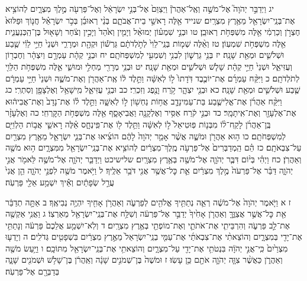 \documentclass[twoside, openany, parskip=half, 11pt]{book}
\begin{document}
יג וַיְדַבֵּ֣ר יְהֹוָה֮ אֶל־מֹשֶׁ֣ה וְאֶֽל־אַהֲרֹן֒ וַיְצַוֵּם֙ אֶל־בְּנֵ֣י יִשְׂרָאֵ֔ל וְאֶל־פַּרְעֹ֖ה מֶ֣לֶךְ מִצְרָ֑יִם לְהוֹצִ֥יא אֶת־בְּנֵֽי־יִשְׂרָאֵ֖ל מֵאֶ֥רֶץ מִצְרָֽיִם׃
שנייד אֵ֖לֶּה רָאשֵׁ֣י בֵית־אֲבֹתָ֑ם בְּנֵ֨י רְאוּבֵ֜ן בְּכֹ֣ר יִשְׂרָאֵ֗ל חֲנ֤וֹךְ וּפַלּוּא֙ חֶצְרֹ֣ן וְכַרְמִ֔י אֵ֖לֶּה מִשְׁפְּחֹ֥ת רְאוּבֵֽן׃ טו וּבְנֵ֣י שִׁמְע֗וֹן יְמוּאֵ֨ל וְיָמִ֤ין וְאֹ֙הַד֙ וְיָכִ֣ין וְצֹ֔חַר וְשָׁא֖וּל בֶּן־הַֽכְּנַעֲנִ֑ית אֵ֖לֶּה מִשְׁפְּחֹ֥ת שִׁמְעֽוֹן׃ טז וְאֵ֨לֶּה שְׁמ֤וֹת בְּנֵֽי־לֵוִי֙ לְתֹ֣לְדֹתָ֔ם גֵּרְשׁ֕וֹן וּקְהָ֖ת וּמְרָרִ֑י וּשְׁנֵי֙ חַיֵּ֣י לֵוִ֔י שֶׁ֧בַע וּשְׁלֹשִׁ֛ים וּמְאַ֖ת שָׁנָֽה׃ יז בְּנֵ֥י גֵרְשׁ֛וֹן לִבְנִ֥י וְשִׁמְעִ֖י לְמִשְׁפְּחֹתָֽם׃ יח וּבְנֵ֣י קְהָ֔ת עַמְרָ֣ם וְיִצְהָ֔ר וְחֶבְר֖וֹן וְעֻזִּיאֵ֑ל וּשְׁנֵי֙ חַיֵּ֣י קְהָ֔ת שָׁלֹ֧שׁ וּשְׁלֹשִׁ֛ים וּמְאַ֖ת שָׁנָֽה׃ יט וּבְנֵ֥י מְרָרִ֖י מַחְלִ֣י וּמוּשִׁ֑י אֵ֛לֶּה מִשְׁפְּחֹ֥ת הַלֵּוִ֖י לְתֹלְדֹתָֽם׃ כ וַיִּקַּ֨ח עַמְרָ֜ם אֶת־יוֹכֶ֤בֶד דֹּֽדָתוֹ֙ ל֣וֹ לְאִשָּׁ֔ה וַתֵּ֣לֶד ל֔וֹ אֶֽת־אַהֲרֹ֖ן וְאֶת־מֹשֶׁ֑ה וּשְׁנֵי֙ חַיֵּ֣י עַמְרָ֔ם שֶׁ֧בַע וּשְׁלֹשִׁ֛ים וּמְאַ֖ת שָׁנָֽה׃ כא וּבְנֵ֖י יִצְהָ֑ר קֹ֥רַח וָנֶ֖פֶג וְזִכְרִֽי׃ כב וּבְנֵ֖י עֻזִּיאֵ֑ל מִֽישָׁאֵ֥ל וְאֶלְצָפָ֖ן וְסִתְרִֽי׃ כג וַיִּקַּ֨ח אַהֲרֹ֜ן אֶת־אֱלִישֶׁ֧בַע בַּת־עַמִּינָדָ֛ב אֲח֥וֹת נַחְשׁ֖וֹן ל֣וֹ לְאִשָּׁ֑ה וַתֵּ֣לֶד ל֗וֹ אֶת־נָדָב֙ וְאֶת־אֲבִיה֔וּא אֶת־אֶלְעָזָ֖ר וְאֶת־אִֽיתָמָֽר׃ כד וּבְנֵ֣י קֹ֔רַח אַסִּ֥יר וְאֶלְקָנָ֖ה וַאֲבִיאָסָ֑ף אֵ֖לֶּה מִשְׁפְּחֹ֥ת הַקׇּרְחִֽי׃ כה וְאֶלְעָזָ֨ר בֶּֽן־אַהֲרֹ֜ן לָקַֽח־ל֨וֹ מִבְּנ֤וֹת פּֽוּטִיאֵל֙ ל֣וֹ לְאִשָּׁ֔ה וַתֵּ֥לֶד ל֖וֹ אֶת־פִּֽינְחָ֑ס אֵ֗לֶּה רָאשֵׁ֛י אֲב֥וֹת הַלְוִיִּ֖ם לְמִשְׁפְּחֹתָֽם׃ כו ה֥וּא אַהֲרֹ֖ן וּמֹשֶׁ֑ה אֲשֶׁ֨ר אָמַ֤ר יְהֹוָה֙ לָהֶ֔ם הוֹצִ֜יאוּ אֶת־בְּנֵ֧י יִשְׂרָאֵ֛ל מֵאֶ֥רֶץ מִצְרַ֖יִם עַל־צִבְאֹתָֽם׃ כז הֵ֗ם הַֽמְדַבְּרִים֙ אֶל־פַּרְעֹ֣ה מֶֽלֶךְ־מִצְרַ֔יִם לְהוֹצִ֥יא אֶת־בְּנֵֽי־יִשְׂרָאֵ֖ל מִמִּצְרָ֑יִם ה֥וּא מֹשֶׁ֖ה וְאַהֲרֹֽן׃ כח וַיְהִ֗י בְּי֨וֹם דִּבֶּ֧ר יְהֹוָ֛ה אֶל־מֹשֶׁ֖ה בְּאֶ֥רֶץ מִצְרָֽיִם׃
שלישיכט וַיְדַבֵּ֧ר יְהֹוָ֛ה אֶל־מֹשֶׁ֥ה לֵּאמֹ֖ר אֲנִ֣י יְהֹוָ֑ה דַּבֵּ֗ר אֶל־פַּרְעֹה֙ מֶ֣לֶךְ מִצְרַ֔יִם אֵ֛ת כׇּל־אֲשֶׁ֥ר אֲנִ֖י דֹּבֵ֥ר אֵלֶֽיךָ׃ ל וַיֹּ֥אמֶר מֹשֶׁ֖ה לִפְנֵ֣י יְהֹוָ֑ה הֵ֤ן אֲנִי֙ עֲרַ֣ל שְׂפָתַ֔יִם וְאֵ֕יךְ יִשְׁמַ֥ע אֵלַ֖י פַּרְעֹֽה׃

ז א וַיֹּ֤אמֶר יְהֹוָה֙ אֶל־מֹשֶׁ֔ה רְאֵ֛ה נְתַתִּ֥יךָ אֱלֹהִ֖ים לְפַרְעֹ֑ה וְאַהֲרֹ֥ן אָחִ֖יךָ יִהְיֶ֥ה נְבִיאֶֽךָ׃ ב אַתָּ֣ה תְדַבֵּ֔ר אֵ֖ת כׇּל־אֲשֶׁ֣ר אֲצַוֶּ֑ךָּ וְאַהֲרֹ֤ן אָחִ֙יךָ֙ יְדַבֵּ֣ר אֶל־פַּרְעֹ֔ה וְשִׁלַּ֥ח אֶת־בְּנֵֽי־יִשְׂרָאֵ֖ל מֵאַרְצֽוֹ׃ ג וַאֲנִ֥י אַקְשֶׁ֖ה אֶת־לֵ֣ב פַּרְעֹ֑ה וְהִרְבֵּיתִ֧י אֶת־אֹתֹתַ֛י וְאֶת־מוֹפְתַ֖י בְּאֶ֥רֶץ מִצְרָֽיִם׃ ד וְלֹֽא־יִשְׁמַ֤ע אֲלֵכֶם֙ פַּרְעֹ֔ה וְנָתַתִּ֥י אֶת־יָדִ֖י בְּמִצְרָ֑יִם וְהוֹצֵאתִ֨י אֶת־צִבְאֹתַ֜י אֶת־עַמִּ֤י בְנֵֽי־יִשְׂרָאֵל֙ מֵאֶ֣רֶץ מִצְרַ֔יִם בִּשְׁפָטִ֖ים גְּדֹלִֽים׃ ה וְיָדְע֤וּ מִצְרַ֙יִם֙ כִּֽי־אֲנִ֣י יְהֹוָ֔ה בִּנְטֹתִ֥י אֶת־יָדִ֖י עַל־מִצְרָ֑יִם וְהוֹצֵאתִ֥י אֶת־בְּנֵֽי־יִשְׂרָאֵ֖ל מִתּוֹכָֽם׃ ו וַיַּ֥עַשׂ מֹשֶׁ֖ה וְאַהֲרֹ֑ן כַּאֲשֶׁ֨ר צִוָּ֧ה יְהֹוָ֛ה אֹתָ֖ם כֵּ֥ן עָשֽׂוּ׃ ז וּמֹשֶׁה֙ בֶּן־שְׁמֹנִ֣ים שָׁנָ֔ה וְאַֽהֲרֹ֔ן בֶּן־שָׁלֹ֥שׁ וּשְׁמֹנִ֖ים שָׁנָ֑ה בְּדַבְּרָ֖ם אֶל־פַּרְעֹֽה׃
\end{document}
